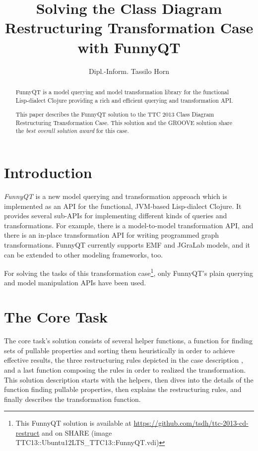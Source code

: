 \documentclass[submission]{eptcs}
\title{Solving the Class Diagram Restructuring Transformation Case with FunnyQT}
\author{Dipl.-Inform. Tassilo Horn
  \email{horn@uni-koblenz.de}
  \institute{Institute for Software Technology, University Koblenz-Landau, Germany}}
\begin{document}
\maketitle

\begin{abstract}
  FunnyQT is a model querying and model transformation library for the
  functional Lisp-dialect Clojure providing a rich and efficient querying and
  transformation API.

  This paper describes the FunnyQT solution to the TTC 2013 Class Diagram
  Restructuring Transformation Case.  This solution and the GROOVE solution
  share the \emph{best overall solution award} for this case.
\end{abstract}

\section{Introduction}
\label{sec:introduction}

\emph{FunnyQT} is a new model querying and transformation approach which is
implemented as an API for the functional, JVM-based Lisp-dialect Clojure.  It
provides several sub-APIs for implementing different kinds of queries and
transformations.  For example, there is a model-to-model transformation API,
and there is an in-place transformation API for writing programmed graph
transformations.  FunnyQT currently supports EMF and JGraLab models, and it can
be extended to other modeling frameworks, too.

For solving the tasks of this transformation case\footnote{This FunnyQT
  solution is available at \url{https://github.com/tsdh/ttc-2013-cd-restruct}
  and on SHARE (image
  \textsf{TTC13::Ubuntu12LTS\_TTC13::FunnyQT.vdi})\label{fn:github}}, only
FunnyQT's plain querying and model manipulation APIs have been used.


\section{The Core Task}
\label{sec:core-task}

The core task's solution consists of several helper functions, a function for
finding sets of pullable properties and sorting them heuristically in order to
achieve effective results, the three restructuring rules depicted in the case
description \cite{cdrestructcasedesc}, and a last function composing the rules
in order to realized the transformation.  This solution description starts with
the helpers, then dives into the details of the function finding pullable
properties, then explains the restructuring rules, and finally describes the
transformation function.
\end{document}
